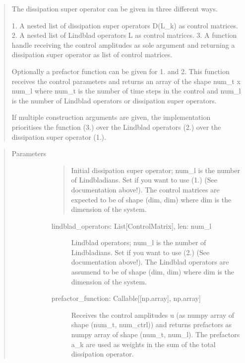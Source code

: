 \documentclass[letterpaper,10pt,english]{sphinxmanual}
\begin{document}
\begin{fulllineitems}
\begin{quote}
\begin{description}
\begin{itemize}
\end{itemize}

\end{description}

The dissipation super operator can be given in three different ways.

1. A nested list of dissipation super operators D(L\_k) as control
matrices.
2. A nested list of Lindblad operators L as control matrices.
3. A function handle receiving the control amplitudes as sole argument and
returning a dissipation super operator as list of control matrices.

Optionally a prefactor function can be given for 1. and 2. This function
receives the control parameters and returns an array of the shape
num\_t x num\_l where num\_t is the number of time steps in the control and
num\_l is the number of Lindblad operators or dissipation super operators.

If multiple construction arguments are given, the implementation
prioritises the function (3.) over the Lindblad operators (2.) over the
dissipation super operator (1.).
\end{quote}
\begin{quote}\begin{description}
\item[{Parameters}] \leavevmode\begin{description}
\item[{}] \leavevmode\begin{quote}

Initial dissipation super operator; num\_l is the number of
Lindbladians. Set if you want to use (1.) (See documentation above!).
The control matrices are expected to be of shape (dim, dim) where dim
is the dimension of the system.
\end{quote}
\begin{description}
\item[{lindblad\_operators: List{[}ControlMatrix{]}, len: num\_l}] \leavevmode
Lindblad operators; num\_l is the number of Lindbladians. Set if you
want to use (2.) (See documentation above!). The Lindblad operators are
assumend to be of shape (dim, dim) where dim is the dimension of the
system.

\item[{prefactor\_function: Callable{[}{[}np.array{]}, np.array{]}}] \leavevmode
Receives the control amplitudes u (as numpy array of shape
(num\_t, num\_ctrl)) and returns prefactors as numpy array
of shape (num\_t, num\_l). The prefactors a\_k are used as weights in the
sum of the total dissipation operator.
\begin{quote}


\end{quote}
\end{description}
\end{description}
\end{description}
\end{quote}
\end{fulllineitems}
\end{document}
